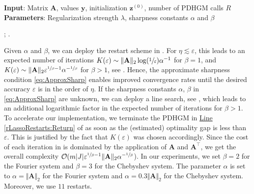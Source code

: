 \documentclass[11pt,reqno, a4paper]{article}
\numberwithin{equation}{section}
\newcommand{\rlasso}{\texttt{rLasso}}
\begin{document}
\begin{algorithm}[H]
\caption{Restarted PDHGM for \rlasso}\label{alg:rsPDHGM}
\textbf{Input}: Matrix $\mathbf A$, values $\mathbf{y}$, initialization $\mathbf{z}^{(0)}$, number of PDHGM calls $R$\\
\textbf{Parameters}: Regularization strength $\lambda$, sharpness constants $\alpha$ and $\beta$
\begin{algorithmic}[1]
\State {}
\State {}; 
\State {}
\State {}.
\State {}
\State {}
\EndFor
\EndFunction
\State \Return {}\label{rLassoRestarts:Return}
\end{algorithmic}
\end{algorithm}

Given $\alpha$ and $\beta$, we can deploy the restart scheme in .
For $\eta \lesssim \varepsilon$, this leads to an expected number of iterations $K(\varepsilon) \sim \lVert \mathbf{A} \rVert_2\log(\sfrac{1}{\varepsilon})\alpha^{-1}$ for $\beta=1$, and $K(\varepsilon) \sim \lVert \mathbf{A} \rVert_2 \varepsilon^{\sfrac{1}{\beta}-1}\alpha^{-\sfrac{1}{\beta}} $ for $\beta>1$, see \cite[Tab.\ 1]{AdcCol2025}.
Hence, the approximate sharpness condition \eqref{eq:ApproxSharp} enables improved convergence rates until the desired accuracy $\varepsilon$ is in the order of $\eta$.
If the sharpness constants $\alpha$, $\beta$ in \eqref{eq:ApproxSharp} are unknown, we can deploy a line search, see \cite[Alg.\ 2]{AdcCol2025}, which leads to an additional logarithmic factor in the expected number of iterations for $\beta>1$.
To accelerate our implementation, we terminate the PDHGM in \hyperref[rLassoRestarts:Return]{Line \ref*{rLassoRestarts:Return}} of  as soon as the (estimated) optimality gap is less than $\varepsilon$.
This is justified by the fact that $K(\varepsilon)$ was chosen accordingly.
Since the cost of each iteration in  is dominated by the application of $\mathbf A$ and $\mathbf{A}^{\top}$, we get the overall complexity $\mathcal O(m \lvert J\rvert\varepsilon^{\sfrac{1}{\beta}-1}\lVert \mathbf{A} \rVert_2\alpha^{-\sfrac{1}{\beta}}$).
In our experiments, we set $\beta=2$ for the Fourier system and $\beta=3$ for the Chebyshev system.
The parameter $\alpha$ is set to $\alpha = \Vert \mathbf A \Vert_2$ for the Fourier system and $\alpha = 0.3 \Vert \mathbf A \Vert_2$ for the Chebyshev system. 
Moreover, we use $11$ restarts.
\end{document}
